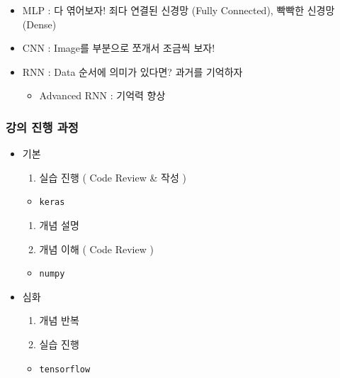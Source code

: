 \documentclass[11pt]{article}
\providecommand{\tightlist}{%
      \setlength{\itemsep}{0pt}\setlength{\parskip}{0pt}}
\begin{document}
\begin{itemize}
  \begin{itemize}
  \tightlist
  \item
    MLP : 다 엮어보자! 죄다 연결된 신경망 (Fully Connected), 빡빡한
    신경망 (Dense)
  \item
    CNN : Image를 부분으로 쪼개서 조금씩 보자!
  \item
    RNN : Data 순서에 의미가 있다면? 과거를 기억하자

    \begin{itemize}
    \tightlist
    \item
      Advanced RNN : 기억력 향상
    \end{itemize}
  \end{itemize}
\end{itemize}

    \hypertarget{uxac15uxc758-uxc9c4uxd589-uxacfcuxc815}{%
\subsubsection{강의 진행
과정}\label{uxac15uxc758-uxc9c4uxd589-uxacfcuxc815}}

\begin{itemize}
\tightlist
\item
  기본

  \begin{enumerate}
  \def\labelenumi{\arabic{enumi}.}
  \tightlist
  \item
    실습 진행 ( Code Review \& 작성 )
  \end{enumerate}

  \begin{itemize}
  \tightlist
  \item
    \texttt{keras}
  \end{itemize}

  \begin{enumerate}
  \def\labelenumi{\arabic{enumi}.}
  \setcounter{enumi}{1}
  \tightlist
  \item
    개념 설명
  \item
    개념 이해 ( Code Review )
  \end{enumerate}

  \begin{itemize}
  \tightlist
  \item
    \texttt{numpy}
  \end{itemize}
\item
  심화

  \begin{enumerate}
  \def\labelenumi{\arabic{enumi}.}
  \tightlist
  \item
    개념 반복
  \item
    실습 진행
  \end{enumerate}

  \begin{itemize}
  \tightlist
  \item
    \texttt{tensorflow}
  \end{itemize}
\end{itemize}
\end{document}
